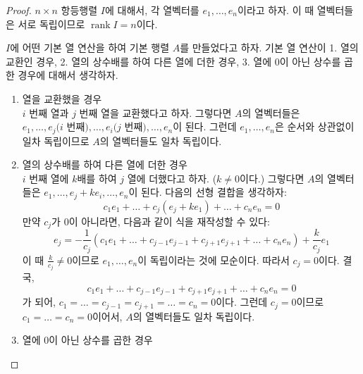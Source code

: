 \documentclass[unfonts,oneside,a4paper]{oblivoir}
\theoremstyle{definition}
\theoremstyle{theorem}
\theoremstyle{remark}
\theoremstyle{remark}
\theoremstyle{remark}
\theoremstyle{remark}
\renewcommand{\vec}[1]{\bm{\mathit{#1}}}
\newcommand{\vecz}{\bm{\mathrm{0}}}
\DeclareMathOperator{\rank}{rank}
\begin{document}
\begin{proof}
    $n \times n$ 항등행렬 $I$에 대해서, 각 열벡터를 $\vec e_1, \dots, \vec e_n$이라고 하자.
    이 때 열벡터들은 서로 독립이므로 $\rank I = n$이다.

    $I$에 어떤 기본 열 연산을 하여 기본 행렬 $A$를 만들었다고 하자.
    기본 열 연산이 1. 열의 교환인 경우, 2. 열의 상수배를 하여 다른 열에 더한 경우, 3. 열에 0이 아닌 상수를 곱한 경우에 대해서 생각하자.
    \begin{enumerate}
        \item 열을 교환했을 경우\\
            $i$ 번째 열과 $j$ 번째 열을 교환했다고 하자.
            그렇다면 $A$의 열벡터들은 $\vec e_1, \dots, \vec e_j \text{($i$ 번째)}, \dots, \vec e_i \text{($j$ 번째)}, \dots, \vec e_n$이 된다.
            그런데 $\vec e_1, \dots, \vec e_n$은 순서와 상관없이 일차 독립이므로 $A$의 열벡터들도 일차 독립이다.
        \item 열의 상수배를 하여 다른 열에 더한 경우\\
            $i$ 번째 열에 $k$배를 하여 $j$ 열에 더했다고 하자.
            ($k \neq 0$이다.)
            그렇다면 $A$의 열벡터들은 $\vec e_1, \dots, \vec e_j + k \vec e_i, \dots, \vec e_n$이 된다.
            다음의 선형 결합을 생각하자:
            \begin{equation*}
                c_1 \vec e_1 + \dots + c_j (\vec e_j + k \vec e_1) + \dots + c_n \vec e_n = \vecz
            \end{equation*}
            만약 $c_j$가 0이 아니라면, 다음과 같이 식을 재작성할 수 있다:
            \begin{equation*}
                \vec e_j = -\frac{1}{c_j} \left(c_1 \vec e_1 + \dots + c_{j - 1} \vec e_{j - 1} + c_{j + 1} \vec e_{j + 1} + \dots + c_n \vec e_n\right) + \frac{k}{c_j} \vec e_1
            \end{equation*}
            이 때 $\frac{k}{c_j} \neq 0$이므로 $\vec e_1, \dots, \vec e_n$이 독립이라는 것에 모순이다.
            따라서 $c_j = 0$이다.
            결국,
            \begin{equation*}
                c_1 \vec e_1 + \dots + c_{j - 1} \vec e_{j - 1} + c_{j + 1} \vec e_{j + 1} + \dots + c_n \vec e_n = \vecz
            \end{equation*}
            가 되어, $c_1 = \dots = c_{j - 1} = c_{j + 1} = \dots = c_n = 0$이다.
            그런데 $c_j = 0$이므로 $c_1 = \dots = c_n = 0$이어서, $A$의 열벡터들도 일차 독립이다.
        \item 열에 0이 아닌 상수를 곱한 경우\\

\end{enumerate}
\end{proof}
\end{document}
